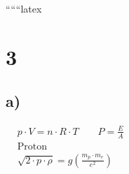 
``````latex


\section*{3}

\subsection*{a)}

\begin{align*}
& p \cdot V = n \cdot R \cdot T \quad \quad P = \frac{E}{A} \\
& \text{Proton} \\
& \sqrt{2 \cdot p \cdot \rho} = g \left( \frac{m_{p} \cdot m_{e}}{e^{2}} \right) \\
& \quad \quad \quad \quad \quad \quad \quad \quad \quad \quad \quad \quad \quad \quad \quad \quad \quad \quad \quad \quad \quad \quad \quad \quad \quad \quad \quad \quad \quad \quad \quad \quad \quad \quad \quad \quad \quad \quad \quad \quad \quad \quad \quad \quad \quad \quad \quad \quad \quad \quad \quad \quad \quad \quad \quad \quad \quad \quad \quad \quad \quad \quad \quad \quad \quad \quad \quad \quad \quad \quad \quad \quad \quad \quad \quad \quad \quad \quad \quad \quad \quad \quad \quad \quad \quad \quad \quad \quad \quad \quad \quad \quad \quad \quad \quad \quad \quad \quad \quad \quad \quad \quad \quad \quad \quad \quad \quad \quad \quad \quad \quad \quad \quad \quad \quad \quad \quad \quad \quad \quad \quad \quad \quad \quad \quad \quad \quad \quad \quad \quad \quad \quad \quad \quad \quad \quad \quad \quad \quad \quad \quad \quad \quad \quad \quad \quad \quad \quad \quad \quad \quad \quad \quad \quad \quad \quad \quad \quad \quad \quad \quad \quad \quad \quad \quad \quad \quad \quad \quad \quad \quad \quad \quad \quad \quad \quad \quad \quad \quad \quad \quad \quad \quad \quad \quad \quad \quad \quad \quad \quad \quad \quad \quad \quad \quad \quad \quad \quad \quad \quad \quad \quad \quad \quad \quad \quad \quad \quad \quad \quad \quad \quad \quad \quad \quad \quad \quad \quad \quad \quad \quad \quad \quad \quad \quad \quad \quad \quad \quad \quad \quad \quad \quad \quad \quad \quad \quad \quad \quad \quad \quad \quad \quad \quad \quad \quad \quad \quad \quad \quad \quad \quad \quad \quad \quad \quad \quad \quad \quad \quad \quad \quad \quad \quad \quad \quad \quad \quad \quad \quad \quad \quad \quad \quad \quad \quad \quad \quad \quad \quad \quad \quad \quad \quad \quad \quad \quad \quad \quad \quad \quad \quad \quad \quad \quad \quad \quad \quad \quad \quad \quad \quad \quad \quad \quad \quad \quad \quad \quad \quad \quad \quad \quad \quad \quad \quad \quad \quad \quad \quad \quad \quad \quad \quad \quad \quad \quad \quad \quad \quad \quad \quad \quad \quad \quad \quad \quad \quad \quad \quad \quad \quad \quad \quad \quad \quad \quad \quad \quad \quad \quad \quad \quad \quad \quad \quad \quad \quad \quad \quad \quad \quad \quad \quad \quad \quad \quad \quad \quad \quad \quad \quad \quad \quad \quad \quad \quad \quad \quad \quad \quad \quad \quad \quad \quad \quad \quad \quad \quad \quad \quad \quad \quad \quad \quad \quad \quad \quad \quad \quad \quad \quad \quad \quad 
\end{align*}
